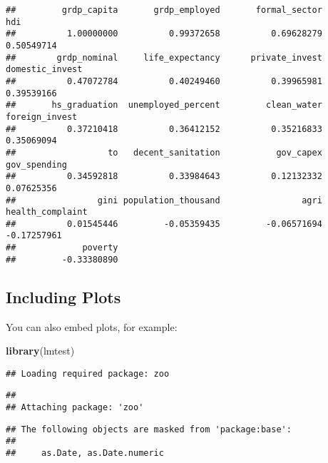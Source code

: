 \documentclass[
]{article}
\newenvironment{Shaded}{\begin{snugshade}}{\end{snugshade}}
\newcommand{\FunctionTok}[1]{\textcolor[rgb]{0.13,0.29,0.53}{\textbf{#1}}}
\newcommand{\NormalTok}[1]{#1}
\begin{document}
\begin{verbatim}
##         grdp_capita       grdp_employed       formal_sector                 hdi 
##          1.00000000          0.99372658          0.69628279          0.50549714 
##        grdp_nominal     life_expectancy      private_invest     domestic_invest 
##          0.47072784          0.40249460          0.39965981          0.39539166 
##       hs_graduation  unemployed_percent         clean_water      foreign_invest 
##          0.37210418          0.36412152          0.35216833          0.35069094 
##                  to   decent_sanitation           gov_capex        gov_spending 
##          0.34592818          0.33984643          0.12132332          0.07625356 
##                gini population_thousand                agri    health_complaint 
##          0.01545446         -0.05359435         -0.06571694         -0.17257961 
##             poverty 
##         -0.33380890
\end{verbatim}

\subsection{Including Plots}\label{including-plots}

You can also embed plots, for example:

\begin{Shaded}
\begin{Highlighting}[]
\FunctionTok{library}\NormalTok{(lmtest)}
\end{Highlighting}
\end{Shaded}

\begin{verbatim}
## Loading required package: zoo
\end{verbatim}

\begin{verbatim}
## 
## Attaching package: 'zoo'
\end{verbatim}

\begin{verbatim}
## The following objects are masked from 'package:base':
## 
##     as.Date, as.Date.numeric
\end{verbatim}
\end{document}
